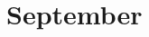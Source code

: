 \documentclass[0main]{subfiles}
\begin{document}
\chapter{September}



\bigskip
\bigskip
\section{}

\subsection{}



\subsection{}



\bigskip
\subsection{}



\bigskip
\bigskip
\section{}

\subsection{}



\subsection{}



\bigskip
\subsection{}



\bigskip
\bigskip
\section{}
\end{document}
